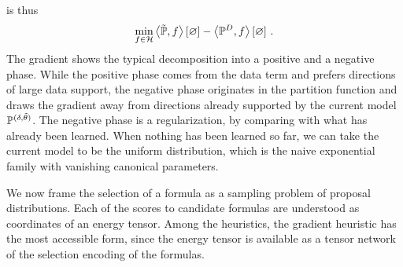  is thus
\begin{align}
    \min_{f\in\mathcal{H}} \left\langle \tilde{\mathbb{P}},f\right\rangle \left[ \varnothing \right] - \left\langle \mathbb{P}^{D},f\right\rangle \left[ \varnothing \right]   \, .
\end{align}
The gradient shows the typical decomposition into a positive and a negative phase.
While the positive phase comes from the data term and prefers directions of large data support, the negative phase originates in the partition function and draws the gradient away from directions already supported by the current model $\mathbb{P}^{(\delta, \tilde{\theta})}$.
The negative phase is a regularization, by comparing with what has already been learned.
When nothing has been learned so far, we can take the current model to be the uniform distribution, which is the naive exponential family with vanishing canonical parameters.







We now frame the selection of a formula as a sampling problem of proposal distributions.
Each of the scores to candidate formulas are understood as coordinates of an energy tensor.
Among the heuristics, the gradient heuristic has the most accessible form, since the energy tensor is available as a tensor network of the selection encoding of the formulas.



